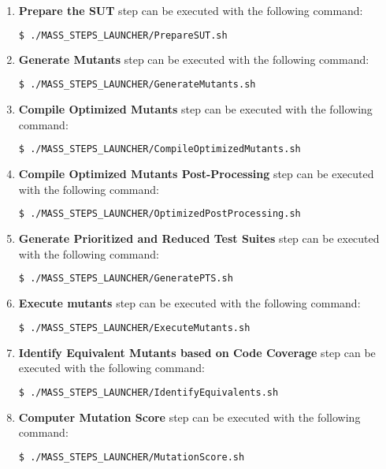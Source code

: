 \begin{enumerate}
	\item \textbf{Prepare the SUT} step can be executed with the following command:

	\begin{lstlisting}[language=bash]
	  $ ./MASS_STEPS_LAUNCHER/PrepareSUT.sh
\end{lstlisting}

	\item \textbf{Generate Mutants} step can be executed with the following command:

	\begin{lstlisting}[language=bash]
	  $ ./MASS_STEPS_LAUNCHER/GenerateMutants.sh
\end{lstlisting}

	\item \textbf{Compile Optimized Mutants} step can be executed with the following command:

	\begin{lstlisting}[language=bash]
	  $ ./MASS_STEPS_LAUNCHER/CompileOptimizedMutants.sh
\end{lstlisting}

	\item \textbf{Compile Optimized Mutants Post-Processing} step can be executed with the following command:

	\begin{lstlisting}[language=bash]
	  $ ./MASS_STEPS_LAUNCHER/OptimizedPostProcessing.sh
\end{lstlisting}

	\item \textbf{Generate Prioritized and Reduced Test Suites} step can be executed with the following command:

	\begin{lstlisting}[language=bash]
	  $ ./MASS_STEPS_LAUNCHER/GeneratePTS.sh
\end{lstlisting}

	\item \textbf{Execute mutants} step can be executed with the following command:

	\begin{lstlisting}[language=bash]
	  $ ./MASS_STEPS_LAUNCHER/ExecuteMutants.sh
\end{lstlisting}

	\item \textbf{Identify Equivalent Mutants based on Code Coverage} step can be executed with the following command:

	\begin{lstlisting}[language=bash]
	  $ ./MASS_STEPS_LAUNCHER/IdentifyEquivalents.sh
\end{lstlisting}

	\item \textbf{Computer Mutation Score} step can be executed with the following command:

	\begin{lstlisting}[language=bash]
	  $ ./MASS_STEPS_LAUNCHER/MutationScore.sh
\end{lstlisting}
\end{enumerate}


